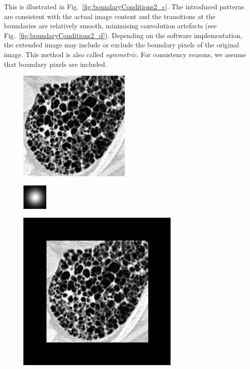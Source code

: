 \documentclass[fleqn,a4paper,oneside,openany]{book}
\begin{document}
This is illustrated in Fig.~\ref{fig:boundaryConditions2_c}.
The introduced patterns are consistent with the actual image content and the transitions at the boundaries are relatively smooth, minimising convolution artefacts (see Fig.~\ref{fig:boundaryConditions2_d}).
Depending on the software implementation, the extended image may include or exclude the boundary pixels of the original image.
This method is also called \textit{symmetric}.
For consistency reasons, we assume that boundary pixels are included.
%
\begin{figure}
\centering
   \begin{minipage}[b]{150pt}
     \centering
     \includegraphics[trim = 0 0 0 0, clip, scale=0.57]{originalF_BC.png}
     \label{fig:boundaryConditions1_a}
     \hspace{100pt}
   \end{minipage}
   \begin{minipage}[b]{150pt}
     \centering
     \includegraphics[trim = 0 0 0 0, clip, scale=0.57]{G_BC.png}
     \label{fig:boundaryConditions1_b}
     \hspace{100pt}
   \end{minipage}
   \begin{minipage}[b]{150pt}
     \centering
     \includegraphics[trim = 0 0 0 0, clip, scale=0.57]{ZeroPadFext_BC.png}

\end{minipage}
\end{figure}
\end{document}
